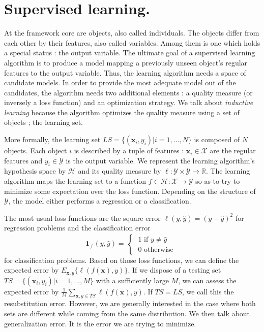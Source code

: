 \documentclass[a4paper]{report}
\newlength{\larg}
\begin{document}
\section{Supervised learning.}
At the framework core are objects, also called individuals. The objects differ from each other by their features, also called variables. Among them is one which holds a special status : the output variable. The ultimate goal of a supervised learning algorithm is to produce a model mapping a previously unseen object's regular features to the output variable. Thus, the learning algorithm needs a space of candidate models. In order to provide the most adequate model out of the candidates, the algorithm needs two additional elements : a quality measure (or inversely a loss function) and an optimization strategy. We talk about \textit{inductive learning} because the algorithm optimizes the quality measure using a set of objects ; the learning set. 
\par
More formally, the learning set $LS = \{ (\boldsymbol{x}_i, y_i) | i = 1,..., N\}$ is composed of $N$ objects. Each object $i$ is described by a tuple of features : $\boldsymbol{x}_i \in \mathcal{X}$ are the regular features and $y_i \in \mathcal{Y}$ is the output variable. We represent the learning algorithm's hypothesis space by $\mathcal{H}$ and its quality measure by $\ell : \mathcal{Y} \times \mathcal{Y} \rightarrow \mathbb{R}$. The learning algorithm maps the learning set to a function $f \in \mathcal{H} : \mathcal{X} \rightarrow \mathcal{Y}$ so as to try to minimize some expectation over the loss function. Depending on the structure of $\mathcal{Y}$, the model either performs a regression or a classification.
\par
The most usual loss functions are the square error $\ell(y, \hat{y}) = (y - \hat{y})^2$ for regression problems and the classification error
\[
\boldsymbol{1}_{\neq}(y,\hat{{y}})=\begin{cases}
\begin{array}{c}
1\text{ if }y \neq \hat{y}\\
0\text{ otherwise}
\end{array}\end{cases}
\]
for classification problems. Based on those loss functions, we can define the expected error by $E_{\boldsymbol{x},y} \{\ell(f(\boldsymbol{x}), y)\}$. If we dispose of a testing set $TS = \{ (\boldsymbol{x}_i, y_i) | i = 1,..., M\}$ with a sufficiently large $M$, we can assess the expected error by $\frac{1}{M}\sum_{\boldsymbol{x}, y \in TS} \ell(f(\boldsymbol{x}), y)$. If $TS = LS$, we call this the resubstitution error. However, we are generally interested in the case where both sets are different while coming from the same distribution. We then talk about generalization error. It is the error we are trying to minimize.
\end{document}
